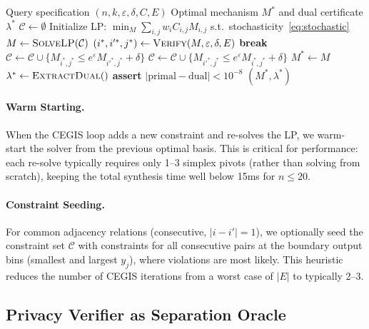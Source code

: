 \documentclass[11pt,a4paper]{article}
\newcommand{\eps}{\varepsilon}
\newcommand{\cC}{\mathcal{C}}
\begin{document}
\begin{algorithm}[t]
\caption{CEGIS-based Optimal Mechanism Synthesis}
\label{alg:cegis}
\begin{algorithmic}[1]
\Require Query specification $(n, k, \eps, \delta, C, E)$
\Ensure Optimal mechanism $M^*$ and dual certificate $\lambda^*$
\State $\cC \gets \emptyset$ 
\State Initialize LP: $\min_{M} \sum_{i,j} w_i C_{i,j} M_{i,j}$ s.t.\ stochasticity~\eqref{eq:stochastic}
\Repeat
  \State $M \gets \textsc{SolveLP}(\cC)$ 
  \State $(i^*, i'^*, j^*) \gets \textsc{Verify}(M, \eps, \delta, E)$ 
   
    \State \textbf{break}
  \EndIf
  \State $\cC \gets \cC \cup \{M_{i^*,j^*} \le e^{\eps} M_{i'^*,j^*} + \delta\}$
  \State $\cC \gets \cC \cup \{M_{i'^*,j^*} \le e^{\eps} M_{i^*,j^*} + \delta\}$ 
\State $M^* \gets M$
\State $\lambda^* \gets \textsc{ExtractDual}()$ 
\State \textbf{assert} $|\text{primal} - \text{dual}| < 10^{-8}$ 
\State \Return $(M^*, \lambda^*)$
\end{algorithmic}
\end{algorithm}

\paragraph{Warm Starting.}
When the CEGIS loop adds a new constraint and re-solves the LP, we warm-start
the solver from the previous optimal basis.  This is critical for performance:
each re-solve typically requires only 1--3 simplex pivots (rather than solving
from scratch), keeping the total synthesis time well below 15ms for $n \le 20$.

\paragraph{Constraint Seeding.}
For common adjacency relations (consecutive, $|i - i'| = 1$), we optionally
seed the constraint set $\cC$ with constraints for all consecutive pairs at the
boundary output bins (smallest and largest $y_j$), where violations are most
likely.  This heuristic reduces the number of CEGIS iterations from a worst case
of $|E|$ to typically 2--3.

\subsection{Privacy Verifier as Separation Oracle}
\label{subsec:verifier}
\end{document}
